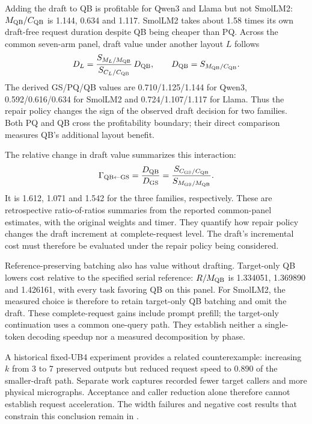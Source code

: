 Adding the draft to QB is profitable for Qwen3 and Llama but not SmolLM2: $M_{\mathrm{QB}}/C_{\mathrm{QB}}$ is 1.144, 0.634 and 1.117. SmolLM2 takes about 1.58 times its own draft-free request duration despite QB being cheaper than PQ. Across the common seven-arm panel, draft value under another layout $L$ follows
\begin{equation}
D_L=\frac{S_{M_L/M_{\mathrm{QB}}}}{S_{C_L/C_{\mathrm{QB}}}}\,D_{\mathrm{QB}},\qquad D_{\mathrm{QB}}=S_{M_{\mathrm{QB}}/C_{\mathrm{QB}}}.
\label{eq:draft}
\end{equation}
The derived GS/PQ/QB values are 0.710/1.125/1.144 for Qwen3, 0.592/0.616/0.634 for SmolLM2 and 0.724/1.107/1.117 for Llama. Thus the repair policy changes the sign of the observed draft decision for two families. Both PQ and QB cross the profitability boundary; their direct comparison measures QB's additional layout benefit.

The relative change in draft value summarizes this interaction:
\begin{equation}
\Gamma_{\mathrm{QB}\leftarrow\mathrm{GS}}=\frac{D_{\mathrm{QB}}}{D_{\mathrm{GS}}}
=\frac{S_{C_{\mathrm{GS}}/C_{\mathrm{QB}}}}{S_{M_{\mathrm{GS}}/M_{\mathrm{QB}}}}.
\label{eq:repairinteraction}
\end{equation}
It is 1.612, 1.071 and 1.542 for the three families, respectively. These are retrospective ratio-of-ratios summaries from the reported common-panel estimates, with the original weights and timer. They quantify how repair policy changes the draft increment at complete-request level. The draft's incremental cost must therefore be evaluated under the repair policy being considered.

Reference-preserving batching also has value without drafting. Target-only QB lowers cost relative to the specified serial reference: $R/M_{\mathrm{QB}}$ is 1.334051, 1.369890 and 1.426161, with every task favoring QB on this panel. For SmolLM2, the measured choice is therefore to retain target-only QB batching and omit the draft. These complete-request gains include prompt prefill; the target-only continuation uses a common one-query path. They establish neither a single-token decoding speedup nor a measured decomposition by phase.

A historical fixed-UB4 experiment provides a related counterexample: increasing $k$ from 3 to 7 preserved outputs but reduced request speed to 0.890 of the smaller-draft path. Separate work captures recorded fewer target callers and more physical micrographs. Acceptance and caller reduction alone therefore cannot establish request acceleration. The width failures and negative cost results that constrain this conclusion remain in .

